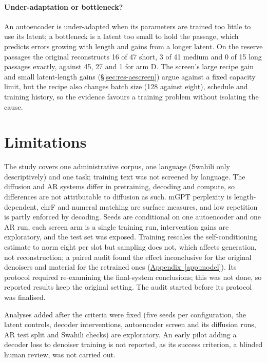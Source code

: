 \documentclass[11pt,a4paper]{article}
\begin{document}
\paragraph{Under-adaptation or bottleneck?} An autoencoder is under-adapted when its parameters are trained too little to use its latent; a bottleneck is a latent too small to hold the passage, which predicts errors growing with length and gains from a longer latent. On the reserve passages the original reconstructs 16 of 47 short, 3 of 41 medium and 0 of 15 long passages exactly, against 45, 27 and 1 for arm D. The screen's large recipe gain and small latent-length gains (\S\ref{sec:res-aescreen}) argue against a fixed capacity limit, but the recipe also changes batch size (128 against eight), schedule and training history, so the evidence favours a training problem without isolating the cause.

\section{Limitations}
\label{sec:limitations}

The study covers one administrative corpus, one language (Swahili only descriptively) and one task; training text was not screened by language. The diffusion and AR systems differ in pretraining, decoding and compute, so differences are not attributable to diffusion as such. mGPT perplexity is length-dependent, chrF and numeral matching are surface measures, and low repetition is partly enforced by decoding. Seeds are conditional on one autoencoder and one AR run, each screen arm is a single training run, intervention gains are exploratory, and the test set was exposed. Training rescales the self-conditioning estimate to norm eight per slot but sampling does not, which affects generation, not reconstruction; a paired audit found the effect inconclusive for the original denoisers and material for the retrained ones (\hyperref[app:model]{Appendix~\ref*{app:model}}). Its protocol required re-examining the final-system conclusions; this was not done, so reported results keep the original setting. The audit started before its protocol was finalised.

Analyses added after the criteria were fixed (five seeds per configuration, the latent controls, decoder interventions, autoencoder screen and its diffusion runs, AR test split and Swahili checks) are exploratory. An early pilot adding a decoder loss to denoiser training is not reported, as its success criterion, a blinded human review, was not carried out.
\end{document}
